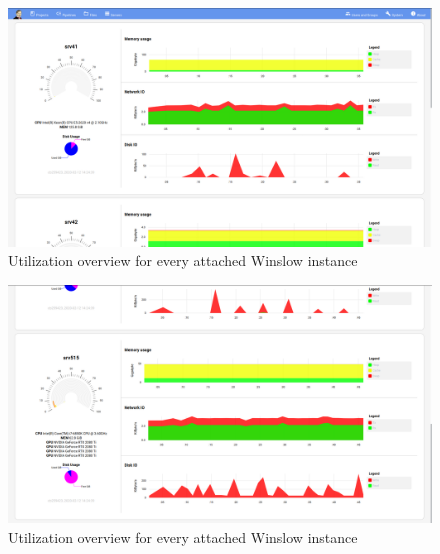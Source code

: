 \begin{figure}[H]
	\centering
	\includegraphics[width=1.0\textwidth]{screenshots/10_servers_1.png}
	\caption{Utilization overview for every attached Winslow instance}
\end{figure}

\begin{figure}[H]
	\centering
	\includegraphics[width=1.0\textwidth]{screenshots/11_servers_2.png}
	\caption{Utilization overview for every attached Winslow instance}
\end{figure}
